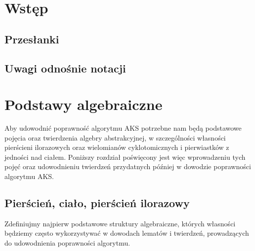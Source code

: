 \documentclass[declaration,shortabstract]{iithesis}
\author         {Martyna Siejba}
\theoremstyle{definition}
\theoremstyle{remark} \newtheorem{observation}{Obserwacja}
\theoremstyle{plain} \newtheorem{theorem}{Twierdzenie}
\theoremstyle{plain} \newtheorem{lemma}{Lemat}
\theoremstyle{remark} \newtheorem*{remark*}{Uwaga}
\theoremstyle{reminder} \newtheorem*{reminder*}{Przypomnienie}
\begin{document}

\chapter{Wstęp}

\section{Przesłanki}

\section{Uwagi odnośnie notacji}

\chapter{Podstawy algebraiczne}

Aby udowodnić poprawność algorytmu AKS potrzebne nam będą podstawowe pojęcia oraz twierdzenia algebry abstrakcyjnej, w szczególności własności pierścieni ilorazowych oraz wielomianów cyklotomicznych i pierwiastków z jedności nad ciałem. Poniższy rozdział poświęcony jest więc wprowadzeniu tych pojęć oraz udowodnieniu twierdzeń przydatnych później w dowodzie poprawności algorytmu AKS.

\section{Pierścień, ciało, pierścień ilorazowy}

Zdefiniujmy najpierw podstawowe struktury algebraiczne, których własności będziemy często wykorzystywać w dowodach lematów i twierdzeń, prowadzących do udowodnienia poprawności algorytmu.
\end{document}

